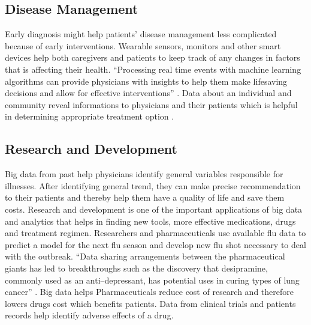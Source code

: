 \documentclass[sigconf]{acmart}
\begin{document}
\subsection{Disease Management} 
Early diagnosis might help patients' disease management less complicated because of early interventions.
Wearable sensors, monitors and other smart devices help both caregivers and patients to keep track of any changes in factors 
that is affecting their health. ``Processing real time events with machine learning algorithms can provide physicians with insights 
to help them make lifesaving decisions and allow for effective interventions'' \cite{www-mapr-com}. Data about an individual and  community reveal informations to physicians and their patients which is helpful in determining appropriate treatment option \cite{www-link-springer-com}. 



\subsection{Research and Development}
Big data from past help physicians identify general variables responsible for illnesses. After identifying general trend, 
they can make precise recommendation to their patients and thereby help them have a quality of life and save them costs. 
Research and development is one of the important applications of big data and
analytics that helps in finding new tools, more effective medications, drugs 
and treatment regimen. Researchers and pharmaceuticals use available flu data to predict a model for the next flu season and develop new flu shot necessary to deal with the outbreak.  ``Data sharing arrangements between the pharmaceutical giants has led to breakthroughs such as the discovery 
that desipramine, commonly used as an anti--depressant, has potential uses in curing types of lung cancer'' \cite{www-forbes-com}. Big data helps Pharmaceuticals reduce cost of research and therefore lowers drugs cost which benefits patients. Data from 
clinical trials and patients records help identify adverse effects of a drug. 
 
 
\end{document}
